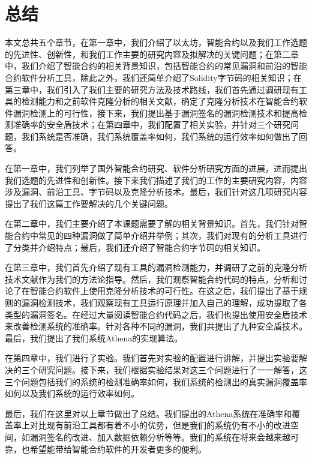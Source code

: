 \chapter{总结}

本文总共五个章节，在第一章中，我们介绍了以太坊，智能合约以及我们工作选题的先进性、创新性，和我们工作主要的研究内容及拟解决的关键问题；在第二章中，我们介绍了智能合约的相关背景知识，包括智能合约的常见漏洞和前沿的智能合约软件分析工具，除此之外，我们还简单介绍了Solidity字节码的相关知识；在第三章中，我们引入了我们主要的研究方法及技术路线，我们首先通过调研现有工具的检测能力和之前软件克隆分析的相关文献，确定了克隆分析技术在智能合约软件漏洞检测上的可行性，接下来，我们提出基于漏洞签名的漏洞检测技术和提高检测准确率的安全盾技术；在第四章中，我们配置了相关实验，并针对三个研究问题，我们系统是否准确，我们系统覆盖率如何，我们系统的运行效率如何做出了回答。

在第一章中，我们列举了国外智能合约研究、软件分析研究方面的进展，进而提出我们选题的先进性和创新性。接下来我们描述了我们的工作的主要研究内容，内容涉及漏洞、前沿工具、字节码以及克隆分析技术。最后，我们针对这几项研究内容提出了我们这篇工作要解决的几个关键问题。

在第二章中，我们主要介绍了本课题需要了解的相关背景知识。首先，我们针对智能合约中常见的四种漏洞做了简单介绍并举例；其次，我们对现有的分析工具进行了分类并介绍特点；最后，我们还介绍了智能合约字节码的相关知识。

在第三章中，我们首先介绍了现有工具的漏洞检测能力，并调研了之前的克隆分析技术文献作为我们的方法论指导。然后，我们观察智能合约代码的特点，分析和讨论了在智能合约软件上使用克隆分析技术的可行性。在这之后，我们提出了基于规则的漏洞检测技术，我们观察现有工具运行原理并加入自己的理解，成功提取了各类型的漏洞签名。在经过大量阅读智能合约代码之后，我们也提出使用安全盾技术来改善检测系统的准确率。针对各种不同的漏洞，我们共提出了九种安全盾技术。最后，我们提出了我们系统Athena的实现算法。

在第四章中，我们进行了实验。我们首先对实验的配置进行讲解，并提出实验要解决的三个研究问题。接下来，我们根据实验结果对这三个问题进行了一一解答，这三个问题包括我们的系统的检测准确率如何，我们系统的检测出的真实漏洞覆盖率如何以及我们系统的运行效率如何。

最后，我们在这里对以上章节做出了总结。我们提出的Athena系统在准确率和覆盖率上对比现有前沿工具都有着不小的优势，但是我们的系统仍有不小的改进空间，如漏洞签名的改进、加入数据依赖分析等等。我们的系统在将来会越来越可靠，也希望能带给智能合约软件的开发者更多的便利。